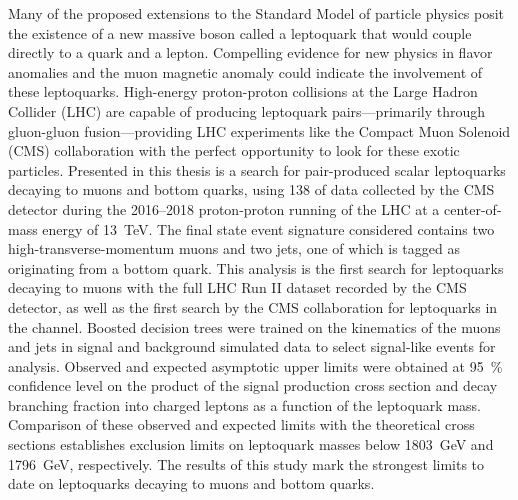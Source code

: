 


Many of the proposed extensions to the Standard Model of particle physics posit the existence of a new massive boson called a leptoquark that would couple directly to a quark and a lepton. Compelling evidence for new physics in flavor anomalies and the muon magnetic anomaly could indicate the involvement of these leptoquarks. High-energy proton-proton collisions at the Large Hadron Collider (LHC) are capable of producing leptoquark pairs---primarily through gluon-gluon fusion---providing LHC experiments like the Compact Muon Solenoid (CMS) collaboration with the perfect opportunity to look for these exotic particles. Presented in this thesis is a search for pair-produced scalar leptoquarks decaying to muons and bottom quarks, using \SI{138}{\invfb} of data collected by the CMS detector during the 2016--2018 proton-proton running of the LHC at a center-of-mass energy of \SI{13}{\TeV}. The final state event signature considered contains two high-transverse-momentum muons and two jets, one of which is tagged as originating from a bottom quark. This analysis is the first search for leptoquarks decaying to muons with the full LHC Run II dataset recorded by the CMS detector, as well as the first search by the CMS collaboration for leptoquarks in the  channel. Boosted decision trees were trained on the kinematics of the muons and jets in signal and background simulated data to select signal-like events for analysis. Observed and expected asymptotic upper limits were obtained at \SI{95}{\%} confidence level on the product of the signal production cross section and decay branching fraction into charged leptons as a function of the leptoquark mass. Comparison of these observed and expected limits with the theoretical cross sections establishes exclusion limits on leptoquark masses below \SI{1803}{\GeV} and \SI{1796}{\GeV}, respectively. The results of this study mark the strongest limits to date on leptoquarks decaying to muons and bottom quarks.